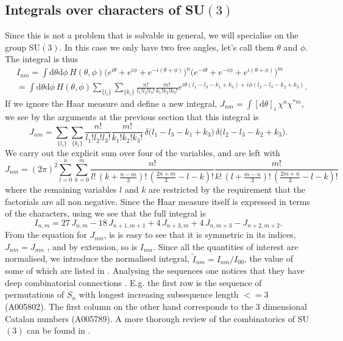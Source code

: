 \subsection{Integrals over characters of SU\texorpdfstring{$(3)$}{(3)}}

Since this is not a problem that is solvable in general, we will specialise on
the group SU$(3)$. In this case we only have two free angles, let's call them
$\theta$ and $\phi$. The integral is thus
%
\begin{align}
  &I_{nm} = \int \mathrm{d} \theta \mathrm{d} \phi \, H(\theta,\phi)
  \big(e^{i\theta} + e^{i\phi} + e^{-i(\theta + \phi)}\big)^n
  \big(e^{-i\theta} + e^{-i\phi} + e^{i(\theta + \phi)}\big)^m \nonumber\\
  &=\int \mathrm{d} \theta \mathrm{d} \phi \, H(\theta,\phi)
  \sum_{\{l_i\}} \sum_{\{k_i\}} \frac{n!}{l_1! l_2! l_3!} \frac{m!}{k_1! k_2!
    k_3!} e^{i \theta (l_1 - l_3 - k_1 + k_3) + i \phi (l_2 - l_3 - k_2 + k_3)}.
\end{align}
%
If we ignore the Haar measure and define a new integral, $J_{nm} = \int
[\mathrm{d} \theta]_i\, \chi^n \chi^{*m}$, we see by the arguments at the previous
section that this integral is
%
\begin{equation}
  J_{nm} = \sum_{\{l_i\}} \sum_{\{k_i\}}
    \frac{n!}{l_1! l_2! l_3!} \frac{m!}{k_1! k_2!k_3!}\,
    \delta\big(l_1 - l_3 - k_1 + k_3\big)\, \delta\big(l_2 - l_3 - k_2 + k_3\big).
\end{equation}
%
We carry out the explicit sum over four of the variables, and are left
with
%
\begin{equation}
  J_{nm} = (2\pi)^2 \sum_{l = 0}^n \sum_{k = 0}^m
    \frac{n!}{l!\, (k + \frac{n-m}{3})!\,(\frac{2n+m}{3} - l - k)!}
    \frac{m!}{k!\, (l + \frac{m-n}{3})!\,(\frac{2m+n}{3} - l - k)!}
\end{equation}
%
where the remaining variables $l$ and $k$ are restricted by the requirement that
the factorials are all non negative. Since the Haar measure itself is expressed
in terms of the characters, using  we see that the
full integral is
%
\begin{equation}
  I_{n,m} = 27\, J_{n,m} - 18\, J_{n+1,m+1} + 4\, J_{n+3,m} + 4\, J_{n,m+3} - J_{n+2,m+2}.
\end{equation}
%
From the equation for $J_{nm}$, is is easy to see that it is symmetric in its
indices, $J_{nm} = J_{mn}$ , and by extension, so is $I_{nm}$. Since all the
quantities of interest are normalised, we introduce the normalised integral,
$\tilde{I}_{nm} = I_{nm} / I_{00}$, the value of some of which are listed in 
. Analysing the sequences one notices that they
have deep combinatorial connections \citep{OEIS}. E.g. the first row is the sequence of
permutations of $S_n$ with longest increasing subsequence length $<=3$
(A005802). The first column on the other hand corresponds to the 3 dimensional
Catalan numbers (A005789). A more thorough review of the combinatorics of
SU$(3)$ can be found in \citep{Unger:2014oga}.


